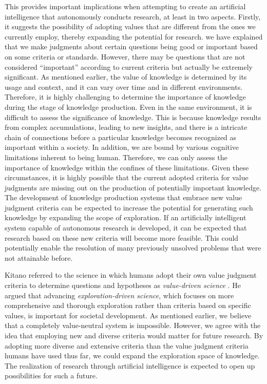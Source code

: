 \documentclass{book}
\begin{document}
This provides important implications when attempting to create an artificial intelligence that autonomously conducts research, at least in two aspects. Firstly, it suggests the possibility of adopting values that are different from the ones we currently employ, thereby expanding the potential for research. we have explained that we make judgments about certain questions being good or important based on some criteria or standards. However, there may be questions that are not considered ``important'' according to current criteria but actually be extremely significant. As mentioned earlier, the value of knowledge is determined by its usage and context, and it can vary over time and in different environments. Therefore, it is highly challenging to determine the importance of knowledge during the stage of knowledge production. Even in the same environment, it is difficult to assess the significance of knowledge. This is because knowledge results from complex accumulations, leading to new insights, and there is a intricate chain of connections before a particular knowledge becomes recognized as important within a society. In addition, we are bound by various cognitive limitations inherent to being human. Therefore, we can only assess the importance of knowledge within the confines of these limitations. Given these circumstances, it is highly possible that the current adopted criteria for value judgments are missing out on the production of potentially important knowledge. The development of knowledge production systems that embrace new value judgment criteria can be expected to increase the potential for generating such knowledge by expanding the scope of exploration. If an artificially intelligent system capable of autonomous research is developed, it can be expected that research based on these new criteria will become more feasible. This could potentially enable the resolution of many previously unsolved problems that were not attainable before.

Kitano referred to the science in which humans adopt their own value judgment criteria to determine questions and hypotheses as \textit{value-driven science} \cite{kitano2021nobel}. He argued that advancing \textit{exploration-driven science}, which focuses on more comprehensive and thorough exploration rather than criteria based on specific values, is important for societal development. As mentioned earlier, we believe that a completely value-neutral system is impossible. However, we agree with the idea that employing new and diverse criteria would matter for future research. By adopting more diverse and extensive criteria than the value judgment criteria humans have used thus far, we could expand the exploration space of knowledge. The realization of research through artificial intelligence is expected to open up possibilities for such a future.
\end{document}

